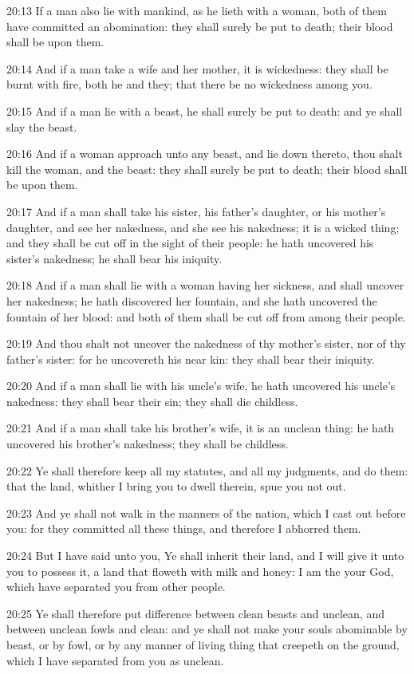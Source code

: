 20:13 If a man also lie with mankind, as he lieth with a woman, both
of them have committed an abomination: they shall surely be put to
death; their blood shall be upon them.

20:14 And if a man take a wife and her mother, it is wickedness: they
shall be burnt with fire, both he and they; that there be no
wickedness among you.

20:15 And if a man lie with a beast, he shall surely be put to death:
and ye shall slay the beast.

20:16 And if a woman approach unto any beast, and lie down thereto,
thou shalt kill the woman, and the beast: they shall surely be put to
death; their blood shall be upon them.

20:17 And if a man shall take his sister, his father's daughter, or
his mother's daughter, and see her nakedness, and she see his
nakedness; it is a wicked thing; and they shall be cut off in the
sight of their people: he hath uncovered his sister's nakedness; he
shall bear his iniquity.

20:18 And if a man shall lie with a woman having her sickness, and
shall uncover her nakedness; he hath discovered her fountain, and she
hath uncovered the fountain of her blood: and both of them shall be
cut off from among their people.

20:19 And thou shalt not uncover the nakedness of thy mother's sister,
nor of thy father's sister: for he uncovereth his near kin: they shall
bear their iniquity.

20:20 And if a man shall lie with his uncle's wife, he hath uncovered
his uncle's nakedness: they shall bear their sin; they shall die
childless.

20:21 And if a man shall take his brother's wife, it is an unclean
thing: he hath uncovered his brother's nakedness; they shall be
childless.

20:22 Ye shall therefore keep all my statutes, and all my judgments,
and do them: that the land, whither I bring you to dwell therein, spue
you not out.

20:23 And ye shall not walk in the manners of the nation, which I cast
out before you: for they committed all these things, and therefore I
abhorred them.

20:24 But I have said unto you, Ye shall inherit their land, and I
will give it unto you to possess it, a land that floweth with milk and
honey: I am the \LORD your God, which have separated you from other
people.

20:25 Ye shall therefore put difference between clean beasts and
unclean, and between unclean fowls and clean: and ye shall not make
your souls abominable by beast, or by fowl, or by any manner of living
thing that creepeth on the ground, which I have separated from you as
unclean.

